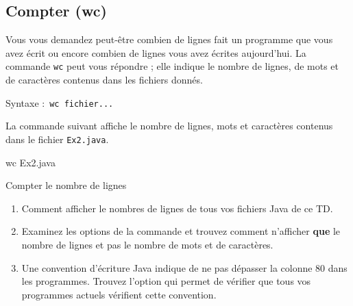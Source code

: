 \documentclass[a4paper,11pt]{article}
\begin{document}
 	\subsection{Compter (wc)}
		Vous vous demandez peut-\^etre combien de lignes fait un programme que vous avez \'ecrit
		ou encore combien de lignes vous avez \'ecrites aujourd'hui.
		La commande \verb_wc_ peut vous r\'epondre ; elle indique le nombre de lignes, de mots et de caract\`eres
		contenus dans les fichiers donn\'es.
		\par
				
		Syntaxe : \,\verb|wc fichier...|\,
            \par
           
       \clearpage 
			
		\begin{Tutoriel}{}
			La commande suivant affiche le nombre de lignes, mots et caract\`eres
			contenus dans le fichier \verb_Ex2.java_.
			\begin{Console}
			wc Ex2.java
			\end{Console}
		\end{Tutoriel}	
		
		\begin{Exercice}{Compter le nombre de lignes} 
			\begin{enumerate}
				
				\item Comment afficher le nombres de lignes de tous vos fichiers Java de ce TD.
						
				\item Examinez les options de la commande et trouvez comment n'afficher \textbf{que}
					le nombre de lignes et pas le nombre de mots et de caract\`eres.
						
				\item Une convention d'\'ecriture Java indique de ne pas d\'epasser la colonne 80 dans les programmes.
					Trouvez l'option qui permet de v\'erifier que tous vos programmes actuels v\'erifient cette convention.
			\end{enumerate}
				
			\par\medskip
		
		\end{Exercice}
            \par
		
\end{document}
